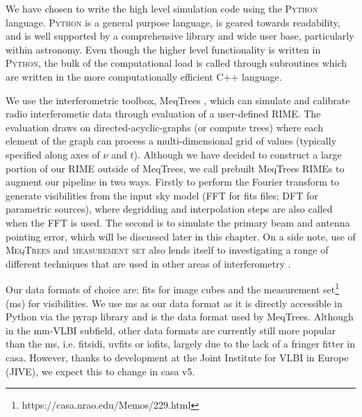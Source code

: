 We have chosen to write the high level simulation code using the \textsc{Python} language. \textsc{Python} is a general purpose language, is geared towards readability, and is well supported by a comprehensive library and wide user base, particularly within astronomy. Even though the higher level functionality is written in \textsc{Python}, the bulk of the computational load is called through subroutines which are written in the more computationally efficient {\sc C++} language.


We use the interferometric toolbox, {\sc MeqTrees} \citep{Noordam_2010}, which can simulate and calibrate radio interferometic data through evaluation of a user-defined RIME. The evaluation draws on directed-acyclic-graphs (or compute trees) where each element of the graph can process a multi-dimensional grid of values (typically specified along axes of $\nu$ and $t$).
Although we have decided to construct a large portion of our RIME outside of {\sc MeqTrees}, we call prebuilt {\sc MeqTrees} RIMEs to augment our pipeline in two ways. Firstly to perform the Fourier transform  to generate visibilities from the input sky model (FFT for fits files; DFT for parametric sources), where degridding and interpolation steps are also called when the FFT is used. The second is to simulate the primary beam and antenna pointing error, which will be discussed later in this chapter. On a side note, use of \textsc{MeqTrees} and \textsc{measurement set} also lends itself to investigating a range of different techniques that are used in other areas of interferometry \citep*[e.g.][]{Smirnov_2015}.


Our data formats of choice are: {\sc fits} for image cubes and the {\sc measurement set}\footnote{https://casa.nrao.edu/Memos/229.html} ({\sc ms}) for visibilities. We use {\sc ms} as our data format as it is directly accessible in {\sc Python} via the {\sc pyrap} library and is the data format used by {\sc MeqTrees}. Although in the mm-VLBI subfield, other data formats are currently still more popular than the {\sc ms}, i.e. {\sc fitsidi}, {\sc uvfits} or {\sc iofits}, largely due to the lack of a fringer fitter in {\sc casa}. However,  thanks to development at the Joint Institute for VLBI in Europe (JIVE), we expect this to change in {\sc casa v5}. 


